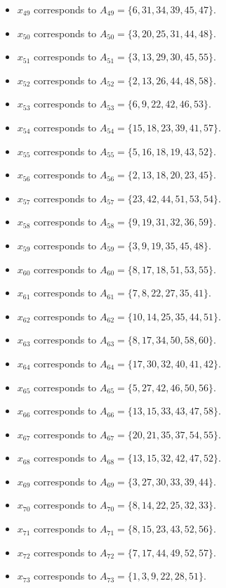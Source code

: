 \documentclass[11pt]{article}
\begin{document}
\begin{itemize}
\item $x_{49}$ corresponds to $A_{49}=\{6, 31, 34, 39, 45, 47\}$.
\item $x_{50}$ corresponds to $A_{50}=\{3, 20, 25, 31, 44, 48\}$.
\item $x_{51}$ corresponds to $A_{51}=\{3, 13, 29, 30, 45, 55\}$.
\item $x_{52}$ corresponds to $A_{52}=\{2, 13, 26, 44, 48, 58\}$.
\item $x_{53}$ corresponds to $A_{53}=\{6, 9, 22, 42, 46, 53\}$.
\item $x_{54}$ corresponds to $A_{54}=\{15, 18, 23, 39, 41, 57\}$.
\item $x_{55}$ corresponds to $A_{55}=\{5, 16, 18, 19, 43, 52\}$.
\item $x_{56}$ corresponds to $A_{56}=\{2, 13, 18, 20, 23, 45\}$.
\item $x_{57}$ corresponds to $A_{57}=\{23, 42, 44, 51, 53, 54\}$.
\item $x_{58}$ corresponds to $A_{58}=\{9, 19, 31, 32, 36, 59\}$.
\item $x_{59}$ corresponds to $A_{59}=\{3, 9, 19, 35, 45, 48\}$.
\item $x_{60}$ corresponds to $A_{60}=\{8, 17, 18, 51, 53, 55\}$.
\item $x_{61}$ corresponds to $A_{61}=\{7, 8, 22, 27, 35, 41\}$.
\item $x_{62}$ corresponds to $A_{62}=\{10, 14, 25, 35, 44, 51\}$.
\item $x_{63}$ corresponds to $A_{63}=\{8, 17, 34, 50, 58, 60\}$.
\item $x_{64}$ corresponds to $A_{64}=\{17, 30, 32, 40, 41, 42\}$.
\item $x_{65}$ corresponds to $A_{65}=\{5, 27, 42, 46, 50, 56\}$.
\item $x_{66}$ corresponds to $A_{66}=\{13, 15, 33, 43, 47, 58\}$.
\item $x_{67}$ corresponds to $A_{67}=\{20, 21, 35, 37, 54, 55\}$.
\item $x_{68}$ corresponds to $A_{68}=\{13, 15, 32, 42, 47, 52\}$.
\item $x_{69}$ corresponds to $A_{69}=\{3, 27, 30, 33, 39, 44\}$.
\item $x_{70}$ corresponds to $A_{70}=\{8, 14, 22, 25, 32, 33\}$.
\item $x_{71}$ corresponds to $A_{71}=\{8, 15, 23, 43, 52, 56\}$.
\item $x_{72}$ corresponds to $A_{72}=\{7, 17, 44, 49, 52, 57\}$.
\item $x_{73}$ corresponds to $A_{73}=\{1, 3, 9, 22, 28, 51\}$.

\end{itemize}
\end{document}
